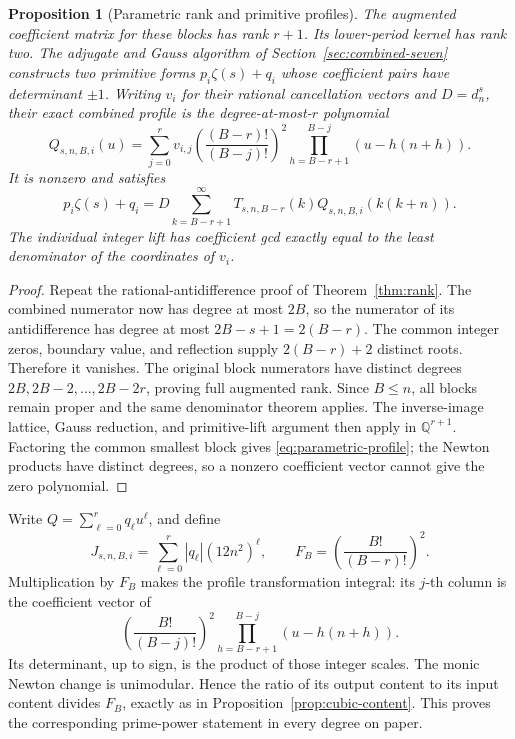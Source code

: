 \documentclass[11pt]{article}
\newtheorem{proposition}[theorem]{Proposition}
\theoremstyle{remark}
\newcommand{\Q}{\mathbb Q}
\begin{document}
\begin{proposition}[Parametric rank and primitive profiles]
The augmented coefficient matrix for these blocks has rank \(r+1\).
Its lower-period kernel has rank two. The adjugate and Gauss algorithm
of Section~\ref{sec:combined-seven} constructs two primitive forms
\(p_i\zeta(s)+q_i\) whose coefficient pairs have determinant \(\pm1\).
Writing \(v_i\) for their rational cancellation vectors and \(D=d_n^s\),
their exact combined profile is the degree-at-most-\(r\) polynomial
\begin{equation}
 Q_{s,n,B,i}(u)=\sum_{j=0}^r v_{i,j}
 \left(\frac{(B-r)!}{(B-j)!}\right)^2
 \prod_{h=B-r+1}^{B-j}(u-h(n+h)).
 \label{eq:parametric-profile}
\end{equation}
It is nonzero and satisfies
\[
 p_i\zeta(s)+q_i=D\sum_{k=B-r+1}^{\infty}
 T_{s,n,B-r}(k)Q_{s,n,B,i}(k(k+n)).
\]
The individual integer lift has coefficient gcd exactly equal to the
least denominator of the coordinates of \(v_i\).
\end{proposition}
\begin{proof}
Repeat the rational-antidifference proof of Theorem~\ref{thm:rank}.
The combined numerator now has degree at most \(2B\), so the numerator
of its antidifference has degree at most \(2B-s+1=2(B-r)\).
The common integer zeros, boundary value, and reflection supply
\(2(B-r)+2\) distinct roots. Therefore it vanishes. The original block
numerators have distinct degrees \(2B,2B-2,\ldots,2B-2r\), proving
full augmented rank. Since \(B\le n\), all blocks remain proper and
the same denominator theorem applies. The inverse-image lattice, Gauss
reduction, and primitive-lift argument then apply in \(\Q^{r+1}\).
Factoring the common smallest block gives
\eqref{eq:parametric-profile}; the Newton products have distinct degrees,
so a nonzero coefficient vector cannot give the zero polynomial.
\end{proof}

Write \(Q=\sum_{\ell=0}^r q_\ell u^\ell\), and define
\[
 J_{s,n,B,i}=\sum_{\ell=0}^r|q_\ell|(12n^2)^\ell,\qquad
 F_B=\left(\frac{B!}{(B-r)!}\right)^2.
\]
Multiplication by \(F_B\) makes the profile transformation integral:
its \(j\)-th column is the coefficient vector of
\[
 \left(\frac{B!}{(B-j)!}\right)^2
       \prod_{h=B-r+1}^{B-j}(u-h(n+h)).
\]
Its determinant, up to sign, is the product of those integer scales.
The monic Newton change is unimodular. Hence the ratio of its output
content to its input content divides \(F_B\), exactly as in
Proposition~\ref{prop:cubic-content}. This proves the corresponding
prime-power statement in every degree on paper.
\end{document}
